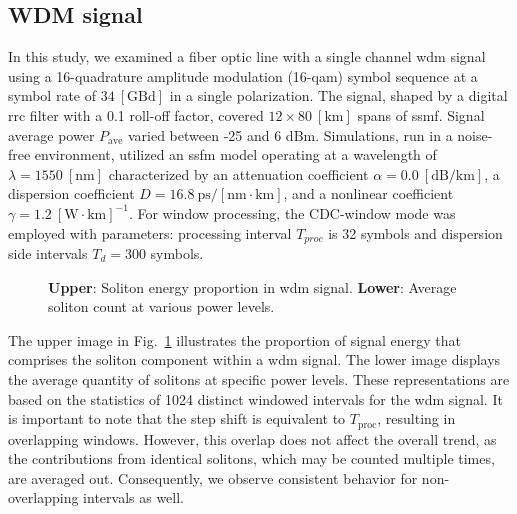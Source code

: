 \subsection{WDM signal}

In this study, we examined a fiber optic line with a single channel \acrshort{wdm} signal using a 16-quadrature amplitude modulation (16-\acrshort{qam}) symbol sequence at a symbol rate of $34\ [\textrm{GBd}]$ in a single polarization. The signal, shaped by a digital \acrfull{rrc} filter with a 0.1 roll-off factor, covered $12 \times 80\ [\textrm{km}]$ spans of \acrfull{ssmf}. Signal average power $P_{\mathrm{ave}}$ varied between -25 and 6 dBm. Simulations, run in a noise-free environment, utilized an \gls{ssfm} model operating at a wavelength of $\lambda = 1550\ [\textrm{nm}]$ characterized by an attenuation coefficient $\alpha = 0.0\ [\textrm{dB}/\textrm{km}]$, a dispersion coefficient $D = 16.8\ \textrm{ps}/[\textrm{nm} \cdot \textrm{km}]$, and a nonlinear coefficient $\gamma = 1.2\ [\textrm{W} \cdot \textrm{km}]^{-1}$. For window processing, the CDC-window mode was employed with parameters: processing interval $T_{proc}$ is 32 symbols and dispersion side intervals $T_d = 300$ symbols.


\begin{figure}[h]
    \caption{\textbf{Upper}: Soliton energy proportion in \acrshort{wdm} signal. \textbf{Lower}: Average soliton count at various power levels.}
    \label{fig:ds_vs_power}
\end{figure}

The upper image in Fig.~\ref{fig:ds_vs_power} illustrates the proportion of signal energy that comprises the soliton component within a \acrshort{wdm} signal. The lower image displays the average quantity of solitons at specific power levels. These representations are based on the statistics of 1024 distinct windowed intervals for the \acrshort{wdm} signal. It is important to note that the step shift is equivalent to \( T_{\text{proc}} \), resulting in overlapping windows. However, this overlap does not affect the overall trend, as the contributions from identical solitons, which may be counted multiple times, are averaged out. Consequently, we observe consistent behavior for non-overlapping intervals as well.

